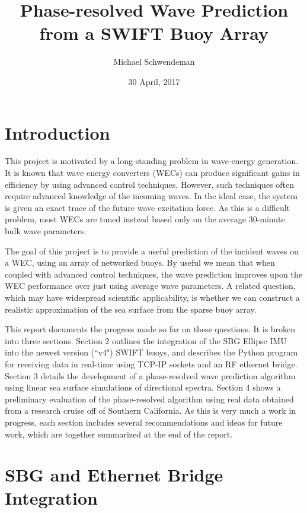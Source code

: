 \documentclass[11pt]{amsart}
\title{Phase-resolved Wave Prediction from a SWIFT Buoy Array}
\author{Michael Schwendeman}
\date{30 April, 2017}                                           %
\begin{document}
\maketitle
\section{Introduction}
This project is motivated by a long-standing problem in wave-energy generation.  It is known that wave energy converters (WECs) can produce significant gains in efficiency by using advanced control techniques.  However, such techniques often require advanced knowledge of the incoming waves.  In the ideal case, the system is given an exact trace of the future wave excitation force.  As this is a difficult problem, most WECs are tuned instead based only on the average 30-minute bulk wave parameters. 

The goal of this project is to provide a useful prediction of the incident waves on a WEC, using an array of networked buoys.  By useful we mean that when coupled with advanced control techniques, the wave prediction improves upon the WEC performance over just using average wave parameters.
A related question, which may have widespread scientific applicability, is whether we can construct a realistic approximation of the sea surface from the sparse buoy array.

This report documents the progress made so far on these questions.  It is broken into three sections.  Section 2 outlines the integration of the SBG Ellipse IMU into the newest version (``v4") SWIFT buoys, and describes the Python program for receiving data in real-time using TCP-IP sockets and an RF ethernet bridge.  Section 3 details the development of a phase-resolved wave prediction algorithm using linear sea surface simulations of directional spectra.  Section 4 shows a preliminary evaluation of the phase-resolved algorithm using real data obtained from a research cruise off of Southern California.  As this is very much a work in progress, each section includes several recommendations and ideas for future work, which are together summarized at the end of the report.

\section{SBG and Ethernet Bridge Integration}
\end{document}
